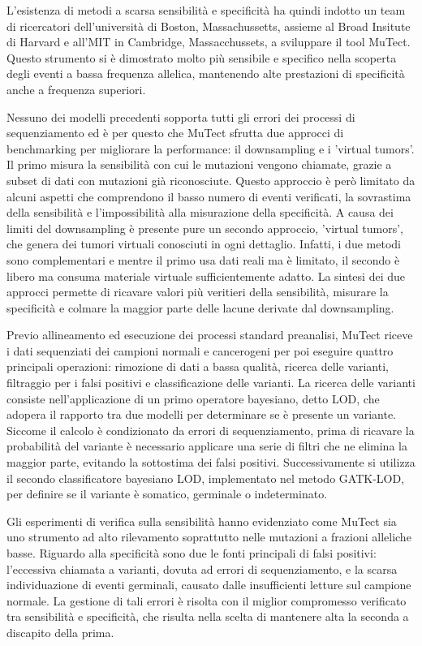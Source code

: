 L'esistenza di metodi a scarsa sensibilità e specificità ha quindi indotto un team di ricercatori dell'università di Boston, Massachussetts, assieme al Broad Insitute di Harvard e all'MIT in Cambridge, Massacchussets, a sviluppare il tool MuTect.
Questo strumento si è dimostrato molto più sensibile e specifico nella scoperta degli eventi a bassa frequenza allelica, mantenendo alte prestazioni di specificità anche a frequenza superiori.

Nessuno dei modelli precedenti sopporta tutti gli errori dei processi di sequenziamento ed è per questo che MuTect sfrutta due approcci di benchmarking per migliorare la performance: il downsampling e  i 'virtual tumors'.
Il primo misura la sensibilità con cui le mutazioni vengono chiamate, grazie a subset di dati con mutazioni già riconosciute.
Questo approccio è però limitato da alcuni aspetti che comprendono il basso numero di eventi verificati, la sovrastima della sensibilità e l'impossibilità alla misurazione della specificità.
A causa dei limiti del downsampling è presente pure un secondo approccio, 'virtual tumors', che genera dei tumori virtuali conosciuti in ogni dettaglio.
Infatti, i due metodi sono complementari e mentre il primo usa dati reali ma è limitato, il secondo è libero ma consuma materiale virtuale sufficientemente adatto.
La sintesi dei due approcci permette di ricavare valori più veritieri della  sensibilità, misurare la specificità e colmare la maggior parte delle lacune derivate dal downsampling.

Previo allineamento ed esecuzione dei processi standard preanalisi, MuTect riceve i dati sequenziati dei campioni normali e cancerogeni per poi eseguire quattro principali operazioni: rimozione di dati a bassa qualità, ricerca delle varianti, filtraggio per i falsi positivi e classificazione delle varianti.
La ricerca delle varianti consiste nell'applicazione di un primo operatore bayesiano, detto LOD, che adopera il rapporto tra due modelli per determinare se è presente un variante.
Siccome il calcolo è condizionato da errori di sequenziamento, prima di ricavare la probabilità del variante è necessario applicare una serie di filtri che ne elimina la maggior parte, evitando la sottostima dei falsi positivi.
Successivamente si utilizza il secondo classificatore bayesiano LOD, implementato nel metodo GATK-LOD, per definire se il variante è somatico, germinale o indeterminato.

Gli esperimenti di verifica sulla sensibilità hanno evidenziato come MuTect sia uno strumento ad alto rilevamento soprattutto nelle mutazioni a frazioni alleliche basse.
Riguardo alla specificità sono due le fonti principali di falsi positivi: l'eccessiva chiamata a varianti, dovuta ad errori di sequenziamento, e la scarsa individuazione di eventi germinali, causato dalle insufficienti letture sul campione normale.
La gestione di tali errori è risolta con il miglior compromesso verificato tra sensibilità e specificità, che risulta nella scelta di mantenere alta la seconda a discapito della prima.

